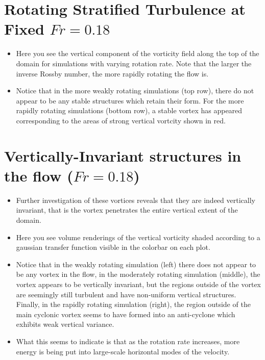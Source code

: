 \documentclass{article}
\begin{document}
\section{Rotating Stratified Turbulence at Fixed $Fr = 0.18$}
\begin{itemize}
    \item Here you see the vertical component of the vorticity field
    along the top of the domain for simulations with varying rotation rate. Note
    that the larger the inverse Rossby number, the more rapidly rotating the
    flow is. 
    \item Notice that in the more weakly rotating simulations (top row), there do not
    appear to be any stable structures which retain their form. For the more
    rapidly rotating simulations (bottom row), a stable vortex has appeared
    corresponding to the areas of strong vertical vortcity shown in red. 
\end{itemize}

\section{Vertically-Invariant structures in the flow ($Fr = 0.18$)}
\begin{itemize}
    \item Further investigation of these vortices reveals that they are indeed
    vertically invariant, that is the vortex penetrates the entire vertical extent
    of the domain. 
    \item Here you see volume renderings of the vertical vorticity shaded
    according to a gaussian transfer function visible in the colorbar on each plot. 
    \item Notice that in the weakly rotating simulation (left) there does not
    appear to be any vortex in the flow, in the moderately rotating simulation
    (middle),
    the vortex appears to be vertically invariant, but the regions outside of
    the vortex are seemingly still turbulent and have non-uniform vertical
    structures. Finally, in the rapidly rotating simulation (right), the region outside
    of the main cyclonic vortex seems to have formed into an anti-cyclone which
    exhibits weak vertical variance. 
    \item What this seems to indicate is that as the rotation rate increases,
    more energy is being put into large-scale horizontal modes of the velocity. 
\end{itemize}
\end{document}

